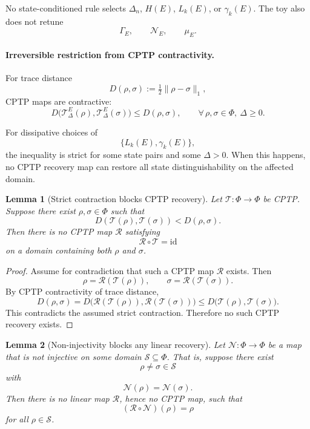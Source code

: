 \documentclass[aps,prx,onecolumn,11pt]{revtex4-2}
\theoremstyle{plain}
\newtheorem{lemma}{Lemma}
\theoremstyle{definition}
\theoremstyle{remark}
\begin{document}
No state-conditioned rule selects \(\Delta_n\), \(H(E)\),
\(L_k(E)\), or \(\gamma_k(E)\). The toy also does not retune
\[
\Gamma_E,
\qquad
\mathcal N_E,
\qquad
\mu_E.
\]

\paragraph{Irreversible restriction from CPTP contractivity.}

For trace distance
\[
D(\rho,\sigma)
:=
\tfrac{1}{2}\|\rho-\sigma\|_1,
\]
CPTP maps are contractive:
\begin{equation}
D\!\bigl(
\mathcal T^E_\Delta(\rho),
\mathcal T^E_\Delta(\sigma)
\bigr)
\leq
D(\rho,\sigma),
\qquad
\forall\,\rho,\sigma\in\Phi,\ \Delta\geq 0.
\label{eq:trace_contractivity_NS1_safe}
\end{equation}

For dissipative choices of
\[
\{L_k(E),\gamma_k(E)\},
\]
the inequality is strict for some state pairs and some
\(\Delta>0\). When this happens, no CPTP recovery map can restore all
state distinguishability on the affected domain.

\begin{lemma}[Strict contraction blocks CPTP recovery]
\label{lem:strict_contraction_no_cptp_recovery}
Let \(\mathcal T:\Phi\to\Phi\) be CPTP. Suppose there exist
\(\rho,\sigma\in\Phi\) such that
\[
D(\mathcal T(\rho),\mathcal T(\sigma))
<
D(\rho,\sigma).
\]
Then there is no CPTP map \(\mathcal R\) satisfying
\[
\mathcal R\circ\mathcal T=\mathrm{id}
\]
on a domain containing both \(\rho\) and \(\sigma\).
\end{lemma}

\begin{proof}
Assume for contradiction that such a CPTP map \(\mathcal R\) exists.
Then
\[
\rho
=
\mathcal R(\mathcal T(\rho)),
\qquad
\sigma
=
\mathcal R(\mathcal T(\sigma)).
\]
By CPTP contractivity of trace distance,
\[
D(\rho,\sigma)
=
D\!\bigl(
\mathcal R(\mathcal T(\rho)),
\mathcal R(\mathcal T(\sigma))
\bigr)
\leq
D\!\bigl(
\mathcal T(\rho),
\mathcal T(\sigma)
\bigr).
\]
This contradicts the assumed strict contraction. Therefore no such
CPTP recovery exists.
\end{proof}

\begin{lemma}[Non-injectivity blocks any linear recovery]
\label{lem:noninjective_no_recovery}
Let \(\mathcal N:\Phi\to\Phi\) be a map that is not injective on some
domain \(\mathcal S\subseteq\Phi\). That is, suppose there exist
\[
\rho\neq\sigma\in\mathcal S
\]
with
\[
\mathcal N(\rho)=\mathcal N(\sigma).
\]
Then there is no linear map \(\mathcal R\), hence no CPTP map, such
that
\[
(\mathcal R\circ\mathcal N)(\rho)=\rho
\]
for all \(\rho\in\mathcal S\).
\end{lemma}
\end{document}
